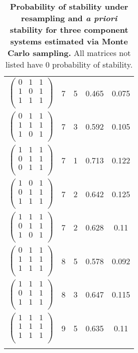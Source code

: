 \begin{longtable}{ c || c | c | c | c }
$\begin{pmatrix}
0 & 1 & 1\\
1 & 0 & 1\\
1 & 1 & 1\\
\end{pmatrix}$ & 7 & 5 & 0.465 & 0.075\\
$\begin{pmatrix}
0 & 1 & 1\\
1 & 1 & 1\\
1 & 0 & 1\\
\end{pmatrix}$ & 7 & 3 & 0.592 & 0.105\\
$\begin{pmatrix}
1 & 1 & 1\\
0 & 1 & 1\\
0 & 1 & 1\\
\end{pmatrix}$ & 7 & 1 & 0.713 & 0.122\\
$\begin{pmatrix}
1 & 0 & 1\\
0 & 1 & 1\\
1 & 1 & 1\\
\end{pmatrix}$ & 7 & 2 & 0.642 & 0.125\\
$\begin{pmatrix}
1 & 1 & 1\\
0 & 1 & 1\\
1 & 0 & 1\\
\end{pmatrix}$ & 7 & 2 & 0.628 & 0.11\\
$\begin{pmatrix}
0 & 1 & 1\\
1 & 1 & 1\\
1 & 1 & 1\\
\end{pmatrix}$ & 8 & 5 & 0.578 & 0.092\\
$\begin{pmatrix}
1 & 1 & 1\\
0 & 1 & 1\\
1 & 1 & 1\\
\end{pmatrix}$ & 8 & 3 & 0.647 & 0.115\\
$\begin{pmatrix}
1 & 1 & 1\\
1 & 1 & 1\\
1 & 1 & 1\\
\end{pmatrix}$ & 9 & 5 & 0.635 & 0.11\\
\caption{{\bf Probability of stability under resampling and \emph{a priori} stability for three component systems estimated via Monte Carlo sampling.} All matrices not listed have $0$ probability of stability.}\label{tab:structstabmat3}
\end{longtable}
